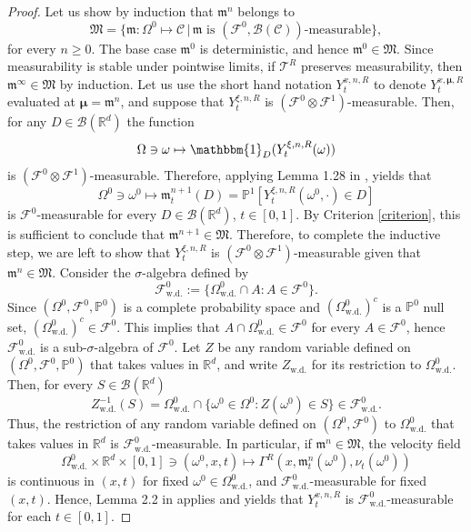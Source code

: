 \documentclass{article}
\newcommand{\R}{\mathbb{R}}
\begin{document}
\begin{appendices}
\begin{proof}
Let us show by induction that $\bm{\mathfrak{m}}^n$ belongs to
\[
\mathfrak{M} = \{ \bm{\mathfrak{m}}: \Omega^0\mapsto \mathcal C \,| \,\bm{\mathfrak{m}} \text{ is } (\mathcal F^0, \mathcal B(\mathcal C))\text{-measurable} \},
\]
for every $n\ge 0$. The base case $\bm{\mathfrak{m}}^0$ is deterministic, and hence $\bm{\mathfrak{m}}^0\in \mathfrak{M}$. Since measurability is stable under pointwise limits, if $\mathcal T^R$ preserves measurability, then $\mathfrak{m}^\infty\in \mathfrak{M}$ by induction. Let us use the short hand notation $Y^{x,n,R}_t$ to denote $Y^{x,\bm{\mu},R}_t$ evaluated at $\bm{\mu}=\bm{\mathfrak{m}}^n$, and suppose that $Y^{\xi,n,R}_t$ is $(\mathcal F^0\otimes\mathcal F^1)$-measurable. Then, for any $D \in \mathcal B(\R^d)$ the function
\[
\Omega\ni \omega\mapsto \mathbbm{1}_{D}(Y^{\xi,n,R}_t(\omega))
\]
is $(\mathcal F^0\otimes \mathcal F^1)$-measurable. Therefore, applying Lemma 1.28 in \cite{Kallenberg2021}, yields that
\[
\Omega^0\ni\omega^0\mapsto\mathfrak{m}^{n+1}_t(D) = \mathbb P^1\left[ Y^{\xi,n,R}_t(\omega^0,\cdot)\in D\right]
\]
is $\mathcal F^0$-measurable for every $D\in\mathcal B(\R^d)$, $t\in[0,1]$. By Criterion \ref{criterion}, this is sufficient to conclude that $\bm{\mathfrak{m}}^{n+1}\in \mathfrak{M}$. Therefore, to complete the inductive step, we are left to show that $Y^{\xi,n,R}_t$ is $(\mathcal F^0\otimes \mathcal F^1)$-measurable given that $\bm{\mathfrak{m}}^n\in \mathfrak{M}$. Consider the $\sigma$-algebra defined by
\[
\mathcal F^0_\mathrm{w.d.}:=\{\Omega^{0}_\mathrm{w.d.}\cap A: A \in \mathcal F^0\}.
\]
Since $(\Omega^0,\mathcal F^0,\mathbb P^0)$ is a complete probability space and $(\Omega^{0}_{\mathrm{w.d.}})^c$ is a $\mathbb P^0$ null set, $(\Omega^{0}_{\mathrm{w.d.}})^c\in\mathcal F^0$. This implies that $A\cap \Omega^0_\mathrm{w.d.}\in \mathcal F^0$ for every $A\in \mathcal F^0$, hence $\mathcal F^0_\mathrm{w.d.}$ is a sub-$\sigma$-algebra of $\mathcal F^0$. Let $Z$ be any random variable  defined on $(\Omega^0,\mathcal F^0,\mathbb P^0)$ that takes values in $\R^d$, and write $Z_\mathrm{w.d.}$ for its restriction to $\Omega^0_\mathrm{w.d.}$. Then, for every $S\in \mathcal B(\R^d)$
\[
Z_\mathrm{w.d.}^{-1}(S) = \Omega^0_\mathrm{w.d.}\cap \{\omega^0\in \Omega^0\colon Z(\omega^0)\in S\}\in \mathcal F^0_\mathrm{w.d.}.
\]
Thus, the restriction of any random variable defined on $(\Omega^0,\mathcal F^0)$ to $\Omega^0_\mathrm{w.d.}$ that takes values in $\R^d$ is $\mathcal F^{0}_\mathrm{w.d.}$-measurable. In particular, if $\bm{\mathfrak{m}}^n \in \mathfrak{M}$, the velocity field
\[
\Omega^0_\mathrm{w.d.}\times \R^d\times[0,1]\ni(\omega^0,x,t)\mapsto\Gamma^R(x,\mathfrak{m}^n_t(\omega^0),\nu_t(\omega^0))
\]
is continuous in $(x,t)$ for fixed $\omega^0\in \Omega^0_\mathrm{w.d.}$, and $\mathcal F^0_\mathrm{w.d.}$-measurable for fixed $(x,t)$. Hence, Lemma 2.2 in \cite{Han2017} applies and yields that $ Y^{x,n,R}_t$ is $\mathcal F^0_\mathrm{w.d.}$-measurable for each $t\in[0,1]$.


\end{proof}
\end{appendices}
\end{document}
